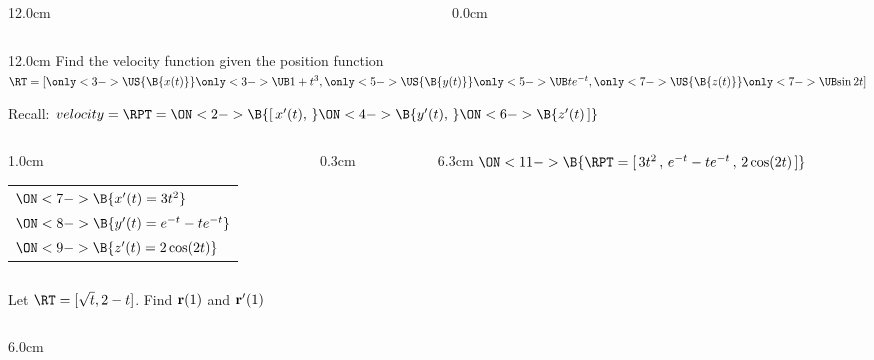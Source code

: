 \begin{frame}
\begin{columns}
\begin{column}{12.0cm}
	\vspace{3.9cm}
	
\end{column}
\begin{column}{0.0cm}\end{column}
\end{columns}
\end{frame}

\begin{frame}
{}
\scriptsize
\begin{columns}
\begin{column}{12.0cm}
\EX Find the velocity function given the position function \quad $\RT = [
\only<3->{\US{\B{ x(t) }}}{
\only<3->{\UB}{ 1+t^3 }}, 
\only<5->{\US{\B{ y(t) }}}{
\only<5->{\UB}{ te^{-t} }}, 
\only<7->{\US{\B{ z(t) }}}{
\only<7->{\UB}{ \sin2t }}]$

\vspace{0.2cm}

Recall: $velocity = \RPT = 
\ON<2->{\B{[ \,x'(t),\,}}
\ON<4->{\B{y'(t),\,}}
\ON<6->{\B{z'(t)\,]}}$
\vspace{0.6cm}

\vspace{0.2cm}
	
	\begin{columns}
	\begin{column}{1.0cm}
		\begin{tabular}{l}
			$\ON<7->{\B{x'(t) = 3t^2}}$ \\
			$\ON<8->{\B{y'(t) = e^{-t} - te^{-t}}}$ \\
			$\ON<9->{\B{z'(t) = 2\cos(2t)}}$
		\end{tabular}
	\end{column}
	\begin{column}{0.3cm}
		\ON<10->{\B{$\D{\implies}$}}
	\end{column}
	\begin{column}{6.3cm}
		$ 
		\ON<11->{\B{\RPT = [\,3t^2\,,\,e^{-t} - te^{-t}\,,\,2\cos(2t)\,]}}$
	\end{column}
	\end{columns}
	
	\vspace{1.0cm}
	
\EX Let $\RT = [\sqrt{t}, 2-t]$.  \quad Find ${\bf r}(1)$ and ${\bf r}'(1)$

\vspace{0.2cm}

\begin{columns}
\begin{column}{6.0cm}
	

\end{column}
\end{columns}
\end{column}
\end{columns}
\end{frame}
